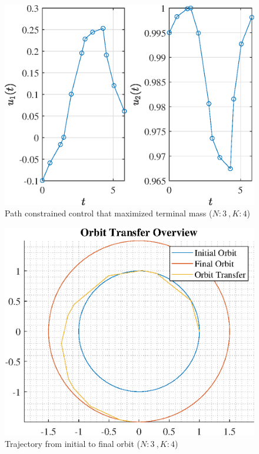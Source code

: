 \documentclass[]{article}
\begin{document}
\begin{figure}
	\centering
	\includegraphics[scale=0.75]{path_N3_K4_C3_mf.eps}
	\caption{Path constrained control that maximized terminal mass (\(N:3\ , K:4\))}
	\label{fig:path_N3_K4_C3_mf}
\end{figure}
\begin{figure}
	\centering
	\includegraphics[scale=0.75]{orbit_N3_K4_C3_mf.eps}
	\caption{Trajectory from initial to final orbit (\(N:3\ , K:4\))}
	\label{fig:orbit_N3_K4_C3_mf}
\end{figure}
\end{document}
